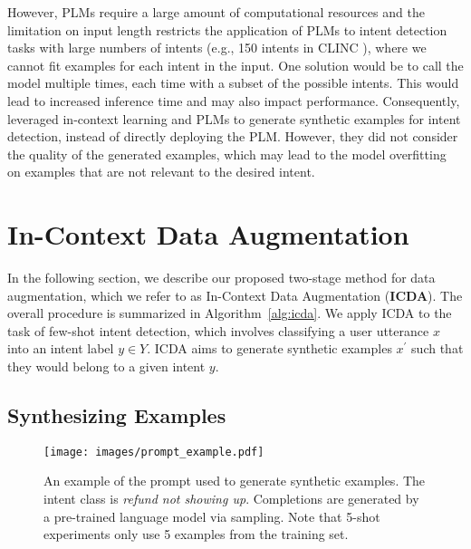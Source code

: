 \documentclass[11pt]{article}
\begin{document}
However, PLMs require a large amount of computational resources and the limitation on input length restricts the application of PLMs to intent detection tasks with large numbers of intents (e.g., 150 intents in CLINC \cite{larson-etal-2019-evaluation}), where we cannot fit examples for each intent in the input. One solution would be to call the model multiple times, each time with a subset of the possible intents. This would lead to increased inference time and may also impact performance.
Consequently, \citet{yoo-etal-2021-gpt3mix-leveraging,sahu-etal-2022-data} leveraged in-context learning and PLMs to generate synthetic examples for intent detection, instead of directly deploying the PLM.
However, they did not consider the quality of the generated examples, which may lead to the model overfitting on examples that are not relevant to the desired intent.



\section{In-Context Data Augmentation}
\label{sec:method}
In the following section, we describe our proposed two-stage method for data augmentation, which we refer to as In-Context Data Augmentation (\textbf{ICDA}).
The overall procedure is summarized in \mbox{Algorithm \ref{alg:icda}}. We apply ICDA to the task of few-shot intent detection, which involves classifying a user utterance $x$ into an intent label $y \in Y$. ICDA aims to generate synthetic examples $x^\prime$ such that they would belong to a given intent $y$.


\subsection{Synthesizing Examples}
\label{sec:synthetizing}

\begin{figure}[t]
    \centering
    \texttt{[image: images/prompt\_example.pdf]}
    \caption{An example of the prompt used to generate synthetic examples.  The intent class is \textit{refund not showing up}. Completions  are generated by a pre-trained language model via sampling. Note that 5-shot experiments only use 5 examples from the training set.}
    \label{fig:synthetic_example}
\end{figure}
\end{document}
